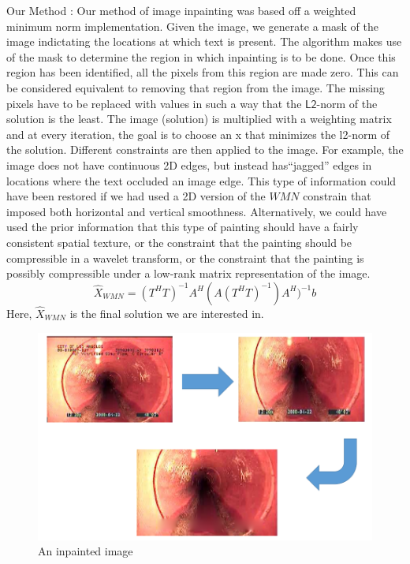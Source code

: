 \documentclass[letterpaper,12pt, onecolumn]{article}%
\begin{document}
Our Method : Our method of image inpainting was based off a weighted minimum norm implementation. Given the image, we generate a mask of the image indictating the locations at which text is present. The algorithm makes use of the mask to determine the region in which inpainting is to be done. Once this region has been identified, all the pixels from this region are made zero. This can be considered equivalent to removing that region from the image. The missing pixels have to be replaced with values in such a way that the $\mathsf{L2}$-norm of the solution is the least. The image (solution) is multiplied with a weighting matrix and at every iteration, the goal is to choose an x that minimizes the l2-norm of the solution. Different constraints are then applied to the image. For example, the image does not have continuous 2D edges, but instead has\enquote{jagged} edges in locations where the text occluded an image edge. This type of information could have been restored if we had used a 2D version of the $WMN$ constrain that imposed both horizontal and vertical smoothness. Alternatively, we could have used the prior information that this type of painting should have a fairly consistent spatial texture, or the constraint that the painting should be compressible in a wavelet transform, or the constraint that the painting is possibly compressible under a low-rank matrix representation of the image. 
\begin{equation}
\hat{X}_{WMN} = (T^H T)^{-1} A^H (A(T^H T)^{-1})A^H)^{-1}b
\end{equation}
Here, $\hat{X}_{WMN}$ is the final solution we are interested in. 
\begin{figure}[!hbtp]
 	  \centering
 	   \includegraphics[scale=0.5] {fig_inpaint.png} 
 	   \caption{An inpainted image}
       \label{fig:inpaint}
\end{figure}
\end{document}
